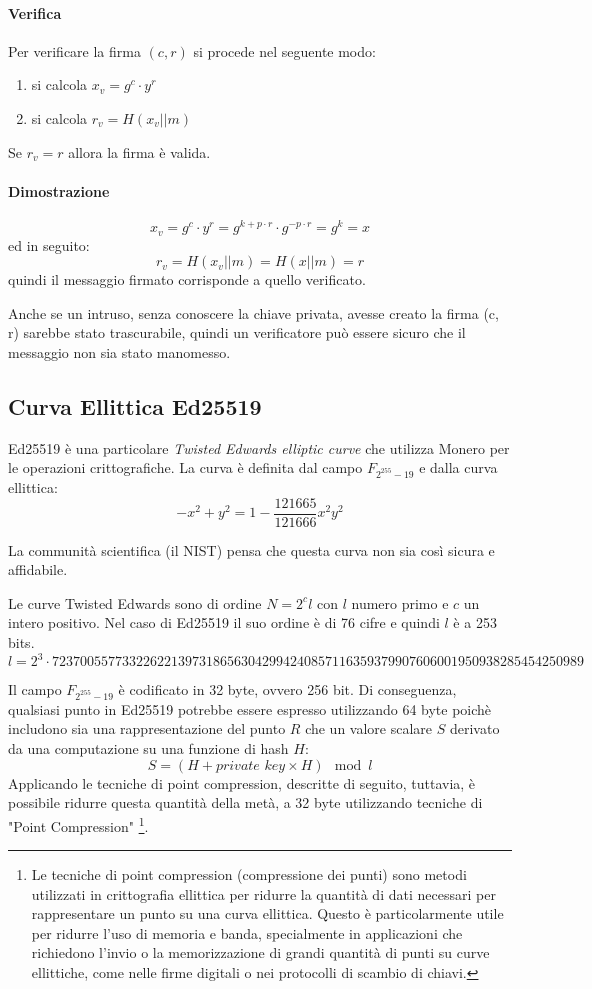 \documentclass[12pt,a4paper]{article}
\begin{document}
\paragraph{Verifica}
Per verificare la firma $ (c, r) $ si procede nel seguente modo:
\begin{enumerate}
    \item si calcola $ x_v = g^c\cdot y^r $
    \item si calcola $ r_v = H(x_v || m) $
\end{enumerate}
Se $ r_v = r $ allora la firma è valida.

\paragraph{Dimostrazione}
$$ x_v = g^c\cdot y^r = g^{k + p\cdot r}\cdot g^{-p\cdot r} = g^k = x $$ ed in
seguito:
$$ r_v = H(x_v || m) = H(x || m) = r $$ quindi il messaggio firmato corrisponde
a quello verificato.

Anche se un intruso, senza conoscere la chiave privata, avesse creato la firma
(c, r) sarebbe stato trascurabile, quindi un verificatore può essere sicuro che
il messaggio non sia stato manomesso.

\subsection{Curva Ellittica Ed25519}
Ed25519 è una particolare \textit{Twisted Edwards elliptic curve} che utilizza
Monero per le operazioni crittografiche. La curva è definita dal campo $
F_{2^{255} - 19} $ e dalla curva ellittica:
$$ -x^2 + y^2 = 1 - \frac{121665}{121666}x^2y^2 $$

La communità scientifica (il NIST) pensa che questa curva non sia così sicura e
affidabile. 

Le curve Twisted Edwards sono di ordine $ N = 2^c l $ con $ l $ numero primo e $
c $ un intero positivo. Nel caso di Ed25519 il suo ordine è di 76 cifre e quindi
$ l $ è a 253 bits.
$$ l = 2^3 \cdot
7237005577332262213973186563042994240857116359379907606001950938285454250989 $$

Il campo $ F_{2^{255} - 19} $ è codificato in 32 byte, ovvero 256 bit. Di
conseguenza, qualsiasi punto in Ed25519 potrebbe essere espresso utilizzando 64
byte poichè includono sia una rappresentazione del punto $ R $ che un valore
scalare $ S $ derivato da una computazione su una funzione di hash $ H $:
$$ S = (H + \textit{private key} \times H) \mod l $$ Applicando le tecniche di
point compression, descritte di seguito, tuttavia, è possibile ridurre questa
quantità della metà, a 32 byte utilizzando tecniche di "Point Compression"
\footnote{ Le tecniche di point compression (compressione dei punti) sono metodi
utilizzati in crittografia ellittica per ridurre la quantità di dati necessari
per rappresentare un punto su una curva ellittica. Questo è particolarmente
utile per ridurre l'uso di memoria e banda, specialmente in applicazioni che
richiedono l'invio o la memorizzazione di grandi quantità di punti su curve
ellittiche, come nelle firme digitali o nei protocolli di scambio di chiavi.}.
\end{document}
